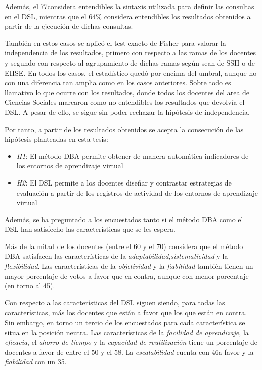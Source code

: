 Además, el 77\percentage considera entendibles la sintaxis utilizada para definir las consultas en el DSL, mientras que el 64\% considera entendibles los resultados obtenidos a partir de la ejecución de dichas consultas.

También en estos casos se aplicó el test exacto de Fisher para valorar la independencia de los resultados, primero con respecto a las ramas de los docentes y segundo con respecto al agrupamiento de dichas ramas según sean de SSH o de EHSE. En todos los casos, el estadístico quedó por encima del umbral, aunque no con una diferencia tan amplia como en los casos anteriores. Sobre todo es llamativo lo que ocurre con los resultados, donde todos los docentes del area de Ciencias Sociales marcaron como no entendibles los resultados que devolvía el DSL. A pesar de ello, se sigue sin poder rechazar la hipótesis de independencia.

Por tanto, a partir de los resultados obtenidos se acepta la consecución de las hipótesis planteadas en esta tesis:
\begin{itemize}
\item \emph{H1}: El método DBA permite obtener de manera automática indicadores de los entornos de aprendizaje virtual
\item \emph{H2}: El DSL permite a los docentes diseñar y contrastar estrategias de evaluación a partir de los registros de actividad de los entornos de aprendizaje virtual
\end{itemize}

Además, se ha preguntado a los encuestados tanto si el método DBA como el DSL han satisfecho las características que se les espera. 

Más de la mitad de los docentes (entre el 60 y el 70\percentage) considera que el método DBA satisfacen las características de la \emph{adaptabilidad},\emph{sistematicidad} y la \emph{flexibilidad}. Las características de la \emph{objetividad} y la \emph{fiabilidad} también tienen un mayor porcentaje de votos a favor que en contra, aunque con menor porcentaje  (en torno al 45\percentage).

Con respecto a las características del DSL siguen siendo, para todas las características, más los docentes que están a favor que los que están en contra. Sin embargo, en torno un tercio de los encuestados para cada característica se situa en la posición neutra. Las características de la \emph{facilidad de aprendizaje}, la \emph{eficacia}, el \emph{ahorro de tiempo} y la \emph{capacidad de reutilización} tiene un porcentaje de docentes a favor de entre el 50 y el 58\percentage. La \emph{escalabilidad} cuenta con 46\percentage a favor y la \emph{fiabilidad} con un 35\percentage. 

